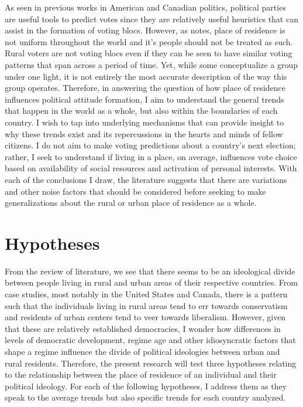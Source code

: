 \documentclass[12pt, titlepage]{article}
\begin{document}
As seen in previous works in American and Canadian politics, political parties are useful tools to predict votes since they are relatively useful heuristics that can assist in the formation of voting blocs. However, as \cite{holloway_burning_2007} notes, place of residence is not uniform throughout the world and it's people should not be treated as such. Rural voters are not voting blocs even if they can be seen to have similar voting patterns that span across a period of time. Yet, while some conceptualize a group under one light, it is not entirely the most accurate description of the way this group operates. Therefore, in answering the question of how place of residence influences political attitude formation, I aim to understand the general trends that happen in the world as a whole, but also within the boundaries of each country. I wish to tap into underlying mechanisms that can provide insight to why these trends exist and its repercussions in the hearts and minds of fellow citizens. I do not aim to make voting predictions about a country's next election; rather, I seek to understand if living in a place, on average, influences vote choice based on availability of social resources and activation of personal interests. With each of the conclusions I draw, the literature suggests that there are variations and other noise factors that should be considered before seeking to make generalizations about the rural or urban place of residence as a whole.

\section{Hypotheses}

From the review of literature, we see that there seems to be an ideological divide between people living in rural and urban areas of their respective countries. From case studies, most notably in the United States and Canada, there is a pattern such that the individuals living in rural areas tend to err towards conservatism and residents of urban centers tend to veer towards liberalism. However, given that these are relatively established democracies, I wonder how differences in levels of democratic development, regime age and other idiosyncratic factors that shape a regime influence the divide of political ideologies between urban and rural residents. Therefore, the present research will test three hypotheses relating to the relationship between the place of residence of an individual and their political ideology. For each of the following hypotheses, I address them as they speak to the average trends but also specific trends for each country analyzed.
\end{document}
